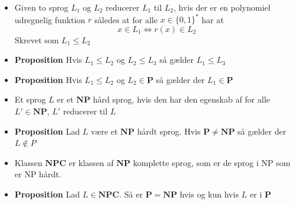 \begin{itemize}
\begin{equation*}
  \end{equation*}
  \item Given to sprog $L_1$ og $L_2$ reducerer $L_1$ til $L_2$, hvis der er en polynomiel udregnelig funktion $r$ således at for alle $x \in \{0,1\}^*$ har at
  \begin{equation*}
    x \in L_1 \Leftrightarrow r(x) \in L_2
  \end{equation*}
  Skrevet som $L_1 \leq L_2$ 
  \item \textbf{Proposition} Hvis $L_1 \leq L_2$ og $L_2 \leq L_3$ så gælder $L_1 \leq L_3$
  \item \textbf{Proposition} Hvis $L_1 \leq L_2$ og $L_2 \in \mathbf P$ så gælder der $L_1 \in \mathbf P$
  \item Et sprog $L$ er et $\mathbf{NP}$ hård sprog, hvis den har den egenskab af for alle $L' \in \mathbf{NP}$, $L'$ reducerer til $L$ 
  \item \textbf{Proposition} Lad $L$ være et $\mathbf{NP}$ hårdt sprog. Hvis $\mathbf P \neq \mathbf{NP}$ så gælder der $L \notin P$
  \item Klassen $\mathbf{NPC}$ er klassen af $\mathbf{NP}$ komplette sprog, som er de sprog i NP som er NP hårdt.
  \item \textbf{Proposition} Lad $L \in \mathbf{NPC}$. Så er $\mathbf P = \mathbf{NP}$ hvis og kun hvis $L$ er i $\mathbf P$
\end{itemize}

